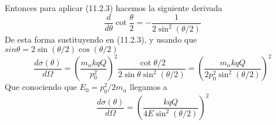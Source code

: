 Entonces para aplicar (11.2.3) hacemos la siguiente derivada
\begin{equation} \label{6.1.1}
    \frac{d}{d\theta} \cot\frac{\theta}{2} = -\frac{1}{2 \sin^2 (\theta/2)}
\end{equation} 
De esta forma sustituyendo en (11.2.3), y usando que $sin\theta = 2\sin(\theta/2) \cos(\theta/2)$
\begin{equation} \label{6.1.1}
    \frac{d\sigma(\theta)}{d\Omega} = \left(\frac{m_{\alpha} k qQ}{p_0^2}\right)^2 \frac{\cot\theta/2}{2\sin \theta \sin^2 (\theta/2)} = \left(\frac{m_{\alpha} k qQ}{2p_0^2 \sin^2(\theta/2)}\right)^2
\end{equation} 
Que conociendo que $E_0 = p_0^2/2 m_{\alpha}$ llegamos a 
\begin{equation} \label{6.1.1}
    \frac{d\sigma(\theta)}{d\Omega} = \left(\frac{k qQ}{4 E \sin^2(\theta/2)}\right)^2
\end{equation} 

